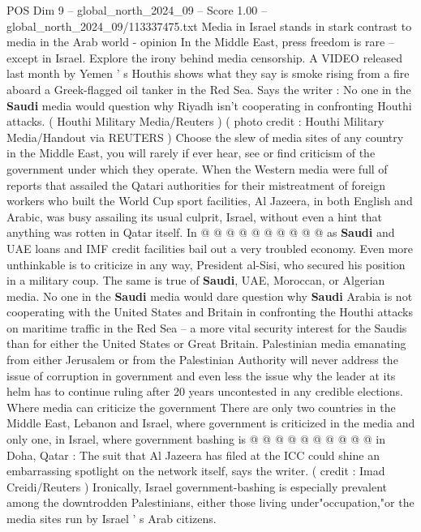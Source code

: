 \begin{textsample}{POS Dim 9 – global\_north\_2024\_09 – Score 1.00 – global\_north\_2024\_09/113337475.txt}  \label{ex:f9_pos_434}
Media in Israel stands in stark contrast to media in the Arab world - opinion In the Middle East, press freedom is rare -- except in Israel.
Explore the irony behind media censorship.
A VIDEO released last month by Yemen ' s Houthis shows what they say is smoke rising from a fire aboard a Greek-flagged oil tanker in the Red Sea.
Says the writer : No one in the \textbf{Saudi} media would question why Riyadh isn't cooperating in confronting Houthi attacks. ( Houthi Military Media/Reuters ) ( photo credit : Houthi Military Media/Handout via REUTERS ) Choose the slew of media sites of any country in the Middle East, you will rarely if ever hear, see or find criticism of the government under which they operate.
When the Western media were full of reports that assailed the Qatari authorities for their mistreatment of foreign workers who built the World Cup sport facilities, Al Jazeera, in both English and Arabic, was busy assailing its usual culprit, Israel, without even a hint that anything was rotten in Qatar itself.
In @ @ @ @ @ @ @ @ @ @ as \textbf{Saudi} and UAE loans and IMF credit facilities bail out a very troubled economy.
Even more unthinkable is to criticize in any way, President al-Sisi, who secured his position in a military coup.
The same is true of \textbf{Saudi}, UAE, Moroccan, or Algerian media.
No one in the \textbf{Saudi} media would dare question why \textbf{Saudi} Arabia is not cooperating with the United States and Britain in confronting the Houthi attacks on maritime traffic in the Red Sea -- a more vital security interest for the Saudis than for either the United States or Great Britain.
Palestinian media emanating from either Jerusalem or from the Palestinian Authority will never address the issue of corruption in government and even less the issue why the leader at its helm has to continue ruling after 20 years uncontested in any credible elections.
Where media can criticize the government There are only two countries in the Middle East, Lebanon and Israel, where government is criticized in the media and only one, in Israel, where government bashing is @ @ @ @ @ @ @ @ @ @ in Doha, Qatar : The suit that Al Jazeera has filed at the ICC could shine an embarrassing spotlight on the network itself, says the writer. ( credit : Imad Creidi/Reuters ) Ironically, Israel government-bashing is especially prevalent among the downtrodden Palestinians, either those living under"occupation,"or the media sites run by Israel ' s Arab citizens.

\end{textsample}
